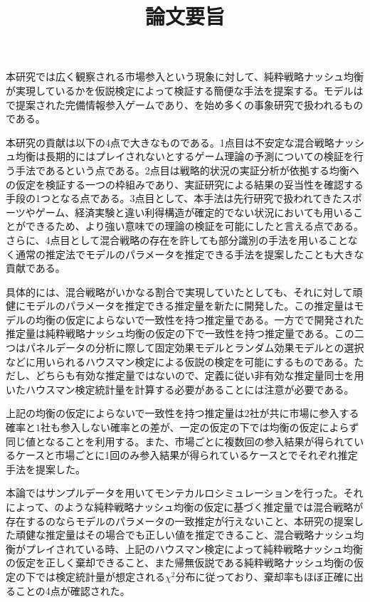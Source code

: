 \documentclass{jsarticle}
\begin{document}
\title{論文要旨}
\maketitle

本研究では広く観察される市場参入という現象に対して、純粋戦略ナッシュ均衡が実現しているかを仮説検定によって検証する簡便な手法を提案する。モデルは\cite{Bresnahan1991}で提案された完備情報参入ゲームであり、\cite{Ciliberto2009a}を始め多くの事象研究で扱われるものである。

本研究の貢献は以下の4点で大きなものである。1点目は不安定な混合戦略ナッシュ均衡は長期的にはプレイされないとするゲーム理論の予測についての検証を行う手法であるという点である。2点目は戦略的状況の実証分析が依拠する均衡への仮定を検証する一つの枠組みであり、実証研究による結果の妥当性を確認する手段の1つとなる点である。3点目として、本手法は先行研究で扱われてきたスポーツやゲーム、経済実験と違い利得構造が確定的でない状況においても用いることができるため、より強い意味での理論の検証を可能にしたと言える点である。さらに、4点目として混合戦略の存在を許しても部分識別の手法を用いることなく通常の推定法でモデルのパラメータを推定できる手法を提案したことも大きな貢献である。

具体的には、混合戦略がいかなる割合で実現していたとしても、それに対して頑健にモデルのパラメータを推定できる推定量を新たに開発した。この推定量はモデルの均衡の仮定によらないで一致性を持つ推定量である。一方で\cite{Bresnahan1991}で開発された推定量は純粋戦略ナッシュ均衡の仮定の下で一致性を持つ推定量である。この二つはパネルデータの分析に際して固定効果モデルとランダム効果モデルとの選択などに用いられるハウスマン検定による仮説の検定を可能にするものである。ただし、どちらも有効な推定量ではないので、定義に従い非有効な推定量同士を用いたハウスマン検定統計量を計算する必要があることには注意が必要である。

上記の均衡の仮定によらないで一致性を持つ推定量は$2$社が共に市場に参入する確率と$1$社も参入しない確率との差が、一定の仮定の下では均衡の仮定によらず同じ値となることを利用する。また、市場ごとに複数回の参入結果が得られているケースと市場ごとに1回のみ参入結果が得られているケースとでそれぞれ推定手法を提案した。

本論ではサンプルデータを用いてモンテカルロシミュレーションを行った。それによって、\cite{Bresnahan1991}のような純粋戦略ナッシュ均衡の仮定に基づく推定量では混合戦略が存在するのならモデルのパラメータの一致推定が行えないこと、本研究の提案した頑健な推定量はその場合でも正しい値を推定できること、混合戦略ナッシュ均衡がプレイされている時、上記のハウスマン検定によって純粋戦略ナッシュ均衡の仮定を正しく棄却できること、また帰無仮説である純粋戦略ナッシュ均衡の仮定の下では検定統計量が想定される$\chi^2$分布に従っており、棄却率もほぼ正確に出ることの4点が確認された。



\end{document}
